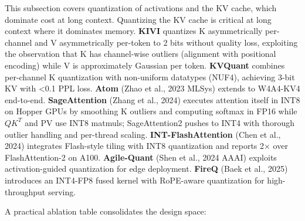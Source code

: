 This subsection covers quantization of activations and the KV cache, which dominate cost at long context. Quantizing the KV cache is critical at long context where it dominates memory. \textbf{KIVI} quantizes K asymmetrically per-channel and V asymmetrically per-token to 2 bits without quality loss, exploiting the observation that K has channel-wise outliers (alignment with positional encoding) while V is approximately Gaussian per token. \textbf{KVQuant} combines per-channel K quantization with non-uniform datatypes (NUF4), achieving 3-bit KV with \textless0.1 PPL loss. \textbf{Atom} (Zhao et al., 2023 MLSys) extends to W4A4-KV4 end-to-end. \textbf{SageAttention} (Zhang et al., 2024) executes attention itself in INT8 on Hopper GPUs by smoothing K outliers and computing softmax in FP16 while \(QK^T\) and PV use INT8 matmuls; SageAttention2 pushes to INT4 with thorough outlier handling and per-thread scaling. \textbf{INT-FlashAttention} (Chen et al., 2024) integrates Flash-style tiling with INT8 quantization and reports 2× over FlashAttention-2 on A100. \textbf{Agile-Quant} (Shen et al., 2024 AAAI) exploits activation-guided quantization for edge deployment. \textbf{FireQ} (Baek et al., 2025) introduces an INT4-FP8 fused kernel with RoPE-aware quantization for high-throughput serving.

A practical ablation table consolidates the design space:

